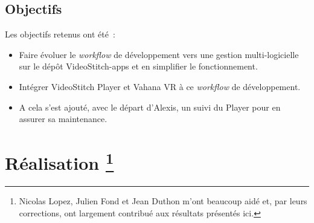\subsection{Objectifs}
Les objectifs retenus ont été~:
\begin{itemize}
  \item Faire évoluer le \textit{workflow} de développement vers une gestion multi-logicielle sur le dépôt VideoStitch-apps 
  et en simplifier le fonctionnement.
  \item Intégrer VideoStitch Player et Vahana VR à ce \textit{workflow} de développement.
  \item A cela s'est ajouté, avec le départ d'Alexis, un suivi du Player pour en assurer
  sa maintenance.
\end{itemize}


\section[Réalisation]{Réalisation
\protect\footnote{Nicolas Lopez, Julien Fond et Jean Duthon m'ont beaucoup aidé et, par 
leurs corrections, ont largement contribué aux résultats présentés ici.}}

